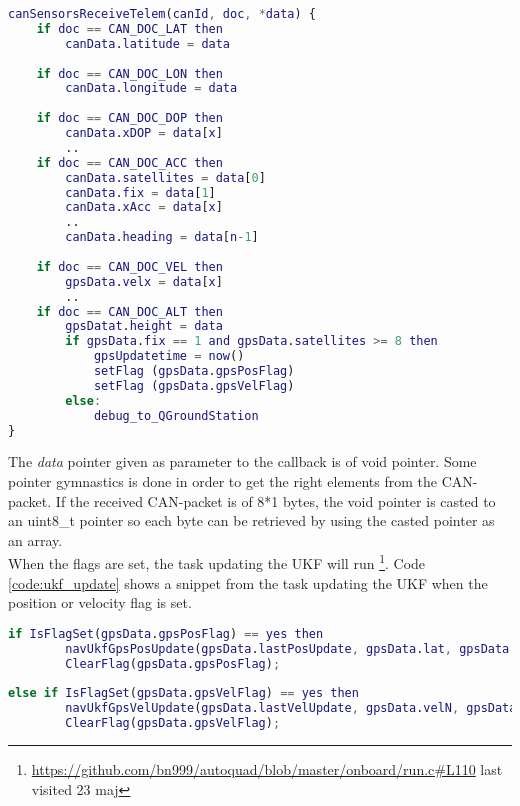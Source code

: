 \begin{lstlisting}[language = Matlab, caption = Modified callback invoked when a sensor-value is received. Shows how doc is used to tell which GPS\-packet is received and when height is received the flags are set, label=code:psudo_parse_can_gps]
canSensorsReceiveTelem(canId, doc, *data) {
	if doc == CAN_DOC_LAT then
		canData.latitude = data
		
	if doc == CAN_DOC_LON then
		canData.longitude = data
		
	if doc == CAN_DOC_DOP then
		canData.xDOP = data[x]
		..
	if doc == CAN_DOC_ACC then
		canData.satellites = data[0]
		canData.fix = data[1]
		canData.xAcc = data[x]
		..
		canData.heading = data[n-1]
		
	if doc == CAN_DOC_VEL then
		gpsData.velx = data[x]
		..		
	if doc == CAN_DOC_ALT then
		gpsDatat.height = data
		if gpsData.fix == 1 and gpsData.satellites >= 8 then
			gpsUpdatetime = now()
			setFlag (gpsData.gpsPosFlag)
			setFlag (gpsData.gpsVelFlag)
		else:
			debug_to_QGroundStation
}
\end{lstlisting}

The \textit{data} pointer given as parameter to the callback is of void pointer. Some pointer gymnastics is done in order to get the right elements from the CAN-packet. If the received CAN-packet is of 8*1 bytes, the void pointer is casted to an uint8\_t pointer so each byte can be retrieved by using the casted pointer as an array. \\

When the flags are set, the task updating the UKF will run \footnote{\url{https://github.com/bn999/autoquad/blob/master/onboard/run.c\#L110} last visited 23 maj}.
Code \ref{code:ukf_update} shows a snippet from the task updating the UKF when the position or velocity flag is set.
\begin{lstlisting}[language = Matlab, caption = Snippet of run.c as psudeocode which updates the UKF when position flag or velocity flag is set, label=code:ukf_update]
if IsFlagSet(gpsData.gpsPosFlag) == yes then
	    navUkfGpsPosUpdate(gpsData.lastPosUpdate, gpsData.lat, gpsData.lon, gpsData.height, ....);
	    ClearFlag(gpsData.gpsPosFlag);
	    
else if IsFlagSet(gpsData.gpsVelFlag) == yes then
	    navUkfGpsVelUpdate(gpsData.lastVelUpdate, gpsData.velN, gpsData.velE, ....);
	    ClearFlag(gpsData.gpsVelFlag);
\end{lstlisting}
